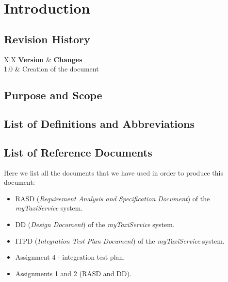 \section{Introduction} %
\label{sec:introduction}

\subsection{Revision History} %
\label{sub:revision_history}
\begin{tabularx}{\textwidth}{ X|X }
	\textbf{Version} & \textbf{Changes} \\ \hline
	 {1.0} & Creation of the document \\
\end{tabularx}

\subsection{Purpose and Scope} %
\label{sub:purpose_and_scope}


\subsection{List of Definitions and Abbreviations} %
\label{sub:definitions_and_abbreviations}

\subsection{List of Reference Documents} %
\label{sub:reference_documents}
Here we list all the documents that we have used in order to produce this document:
\begin{itemize}
	\item RASD (\emph{Requirement Analysis and Specification Document}) of the \emph{myTaxiService} system.
	\item DD (\emph{Design Document}) of the \emph{myTaxiService} system.
	\item ITPD (\emph{Integration Test Plan Document}) of the \emph{myTaxiService} system.
	\item Assignment 4 - integration test plan.
	\item Assignments 1 and 2 (RASD and DD).
\end{itemize}
